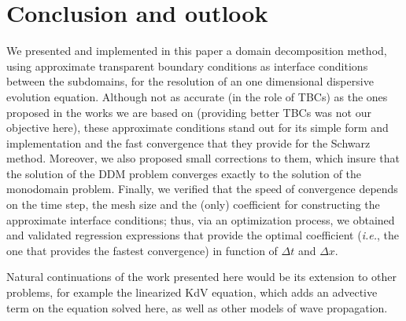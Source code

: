 \section{Conclusion and outlook}

\indent We presented and implemented in this paper a domain decomposition method, using approximate transparent boundary conditions as interface  conditions between the subdomains, for the resolution of an one dimensional dispersive evolution equation. Although not as accurate (in the role of TBCs) as the ones proposed in the works we are based on (providing better TBCs was not our objective here), these approximate conditions stand out for its simple form and implementation and the fast convergence that they provide for the Schwarz method. Moreover, we also proposed small corrections to them, which insure that the solution of the DDM problem converges exactly to the solution of the monodomain problem. Finally, we verified that the speed of convergence depends on the time step, the mesh size and the (only) coefficient for constructing the approximate interface conditions; thus, via an optimization process, we obtained and validated regression expressions that provide the optimal coefficient (\emph{i.e.}, the one that provides the fastest convergence) in function of $\Delta t $ and $\Delta x$.

\indent Natural continuations of the work presented here would be its extension to other problems, for example the linearized KdV equation, which adds an advective term on the equation solved here, as well as other models of wave propagation.